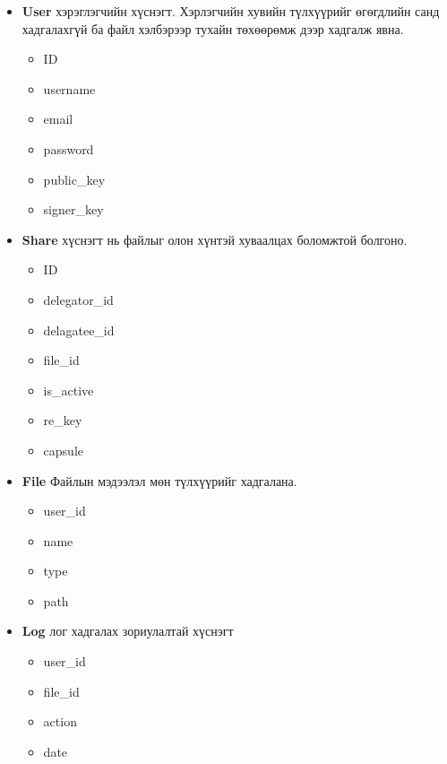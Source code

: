 \begin{itemize}
    \item \textbf{User} хэрэглэгчийн хүснэгт. Хэрлэгчийн хувийн түлхүүрийг өгөгдлийн санд хадгалахгүй ба файл хэлбэрээр тухайн төхөөрөмж дээр хадгалж явна.
          \begin{itemize}
              \item ID
              \item username
              \item email
              \item password
              \item public\_key
              \item signer\_key
          \end{itemize}
    \item \textbf{Share} хүснэгт нь файлыг олон хүнтэй хуваалцах боломжтой болгоно.
          \begin{itemize}
              \item ID
              \item delegator\_id
              \item delagatee\_id
              \item file\_id
              \item is\_active
              \item re\_key
              \item capsule
          \end{itemize}
    \item \textbf{File} Файлын мэдээлэл мөн түлхүүрийг хадгалана.
          \begin{itemize}
              \item user\_id
              \item name
              \item type
              \item path
          \end{itemize}
    \item \textbf{Log} лог хадгалах зориулалтай хүснэгт
          \begin{itemize}
              \item user\_id
              \item file\_id
              \item action
              \item date
          \end{itemize}
\end{itemize}

